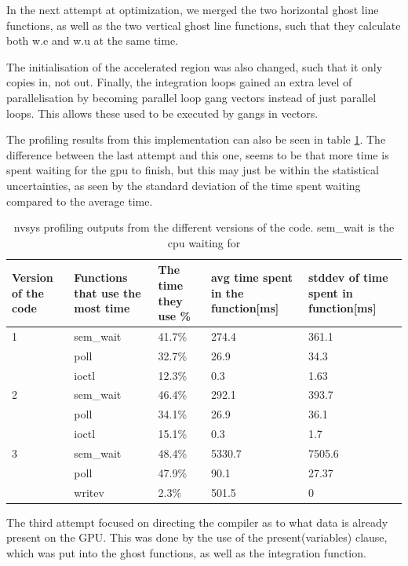 \documentclass{article}
\begin{document}
In the next attempt at optimization, we merged the two horizontal ghost line functions, as well as the two vertical ghost line functions, such that they calculate both w.e and w.u at the same time.

The initialisation of the accelerated region was also changed, such that it only copies in, not out. Finally, the integration loops gained an extra level of parallelisation by becoming parallel loop gang vectors instead of just parallel loops. This allows these used to be executed by gangs in vectors.

The profiling results from this implementation can also be seen in table \ref{tab:nvsys_profiling}. The difference between the last attempt and this one, seems to be that more time is spent waiting for the gpu to finish, but this may just be within the statistical uncertainties, as seen by the standard deviation of the time spent waiting compared to the average time.

\begin{table}
    \centering
    \begin{tabular}{|m{}|m{}|m{}|m{}|m{}|}
    \hline
       Version of the code  & Functions that use the most time & The time they use \% & avg time spent in the function[ms] & stddev of time spent in function[ms]\\
       \hline
       1  & sem\_wait & 41.7\% & 274.4 & 361.1\\
         & poll & 32.7\% & 26.9& 34.3\\
         & ioctl & 12.3\% & 0.3& 1.63\\
         \hline
        2  & sem\_wait & 46.4\% & 292.1& 393.7\\
         & poll & 34.1\% & 26.9& 36.1\\
         & ioctl & 15.1\% & 0.3& 1.7\\
         \hline
        3  & sem\_wait & 48.4\% & 5330.7& 7505.6\\
         & poll & 47.9\% & 90.1& 27.37\\
         & writev & 2.3\% & 501.5& 0\\
         \hline
         
    \end{tabular}
    \caption{nvsys profiling outputs from the different versions of the code. sem\_wait is the cpu waiting for }
    \label{tab:nvsys_profiling}
\end{table}

The third attempt focused on directing the compiler as to what data is already present on the GPU. This was done by the use of the present(variables) clause, which was put into the ghost functions, as well as the integration function.
\end{document}
